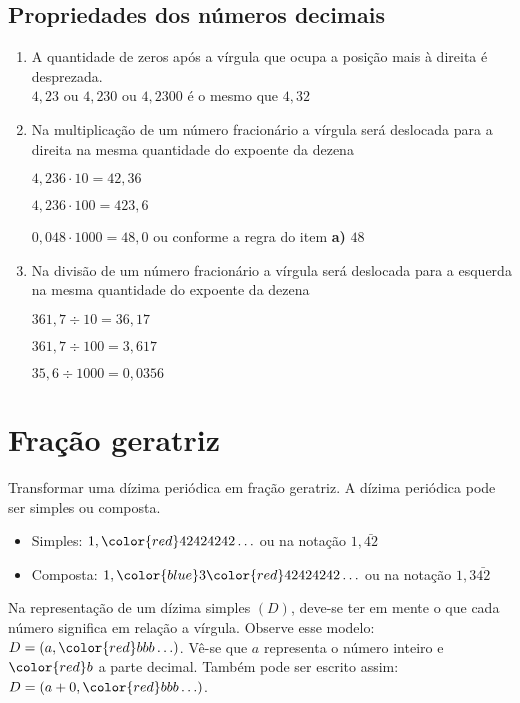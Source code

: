 \subsection{Propriedades dos números decimais}
	\begin{enumerate}[label=\alph*)]
		\item A quantidade de zeros após a vírgula que ocupa a posição mais à direita é desprezada.\\
		$ 4,23 $ ou $ 4,230 $ ou $ 4,2300 $ é o mesmo que $ 4,32 $
		
		\item Na multiplicação de um número fracionário a vírgula será deslocada para a direita na mesma quantidade do expoente da dezena
		\begin{multicols}{3}
			$ 4,236 \cdot 10 = 42,36 $
			
			\columnbreak
			$ 4,236 \cdot 100 = 423,6 $
			
			\columnbreak
			$ 0,048 \cdot 1000 = 48,0 $ ou conforme a regra do item \textbf{a)} $ 48 $
			
		\end{multicols}
		
		\item Na divisão de um número fracionário a vírgula será deslocada para a esquerda na mesma quantidade do expoente da dezena
		\begin{multicols}{3}
			$ 361,7 \div 10 = 36,17 $
			
			\columnbreak
			$ 361,7 \div 100 = 3,617 $
			
			\columnbreak
			$ 35,6 \div 1000 = 0,0356 $
			
		\end{multicols}
	\end{enumerate}

\section{Fração geratriz}
Transformar uma dízima periódica em fração geratriz. A dízima periódica pode ser simples ou composta.
\begin{itemize}
	\item Simples: $ 1,\color{red}42424242 \hdots $ ou na notação $ 1,\bar{42} $
	\item Composta: $ 1,\color{blue}3\color{red}42424242 \hdots $ ou na notação $ 1,3\bar{42} $
\end{itemize}

Na representação de um dízima simples $ (D) $, deve-se ter em mente o que cada número significa em relação a vírgula. Observe esse modelo: $ D = (a,\color{red}bbb \hdots) $. Vê-se que  $ a $ representa o número inteiro e $ \color{red}b $ a parte decimal. Também pode ser escrito assim: \\
$ D = (a + 0,\color{red}bbb \hdots) $.

